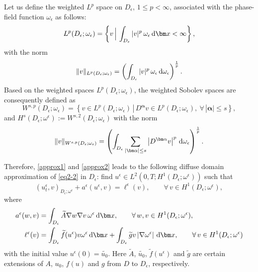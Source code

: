 \documentclass[3p,times]{elsarticle}
\numberwithin{equation}{section}
\newcommand{\dd}{\,{\rm d}}
\begin{document}
Let us define the weighted  $L^p$ space on $D_{\epsilon}$, $1\leq p < \infty$, associated with the phase-field function $\omega_{\epsilon}$ as follows:
\begin{equation*}
	L^p(D_{\epsilon};\omega_{\epsilon})=\left\{v\,\Big|\,\int_{D_{\epsilon}} |v|^p\,\omega_{\epsilon}\dd \bm x<\infty \right\},
\end{equation*}
with the norm
\begin{align*}
	\|v\|_{L^p(D_{\epsilon};\omega_{\epsilon})}=\left(\int_{D_{\epsilon}}|v|^p \,\omega_{\epsilon}\dd \omega_{\epsilon}\right)^{\frac 1 p}.
\end{align*}
Based on the weighted spaces $L^p(D_{\epsilon};\omega_{\epsilon})$,  the weighted Sobolev spaces are consequently defined as
\begin{equation*}
	W^{s,p}(D_{\epsilon};\omega_{\epsilon})=\left\{v\in L^p(D_{\epsilon};\omega_{\epsilon})\,|\, D^{\bm \alpha}v \in L^p(D_{\epsilon};\omega_{\epsilon}), \ \forall\, |\bm\alpha|\leq s \right\},
\end{equation*}
and $H^s(D_{\epsilon};\omega^{\epsilon}):=W^{s,2}(D_{\epsilon};\omega_{\epsilon})$ with the norm 
\begin{equation*}
	\|v\|_{W^{s,p}(D_{\epsilon};\omega_{\epsilon})}=\left(\int_{D_{\epsilon}}\sum\limits_{|\bm\alpha|\leq s}\left|D^{\bm \alpha}v\right|^p\dd\omega_{\epsilon}\right)^{\frac 1 p}.
\end{equation*}

Therefore, \eqref{approx1} and \eqref{approx2} leads to the following  diffuse domain approximation of \eqref{eq2-2} in $D_{\epsilon}$: find  $u^{\epsilon} \in L^2(0,T;H^1(D_{\epsilon};\omega^{\epsilon}))$ such that
\begin{equation}
	\label{weighted_variational}
	\left(u_t^{\epsilon},v \right)_{D_{\epsilon};\omega^{\epsilon}}+a^{\epsilon}(u^{\epsilon},v)= \ell^{\epsilon}(v), \qquad \forall \,v \in H^1(D_{\epsilon};\omega^{\epsilon}),
\end{equation}
where
\begin{equation*}
	\begin{split}
		a^{\epsilon}(w,v) &= \int_{D_{\epsilon}} \widetilde A\nabla w\nabla v \,\omega^{\epsilon}\dd \bm x,\qquad \forall\,w, v\in H^1(D_{\epsilon};\omega^{\epsilon}),\\
		\ell^{\epsilon}(v) &= \int_{D_{\epsilon}} \widetilde f(u^{\epsilon}) v\omega^{\epsilon}\dd \bm x + \int_{D_{\epsilon}} \widetilde gv\left|\nabla \omega^{\epsilon} \right|\dd \bm x,\qquad \forall\, v\in H^1(D_{\epsilon};\omega^{\epsilon})
	\end{split}
\end{equation*}
with the initial value $u^{\epsilon}(0) = \widetilde{u_0}$. Here $\widetilde A$, $\widetilde{u_0}$, $\widetilde f(u^{\epsilon})$  and $\widetilde g$ are certain extensions of $A$, $u_0$, $f(u)$  and $g$ from $D$ to $D_{\epsilon}$, respectively. 
\end{document}
